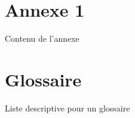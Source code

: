 \documentclass{FramateX}
\begin{document}
 
\chapter{Annexe 1}



%

                    

Contenu de l'annexe


                        
%


\chapter{Glossaire}


%

                    

 Liste descriptive pour un glossaire



\backmatter

            
                        

\end{document}
